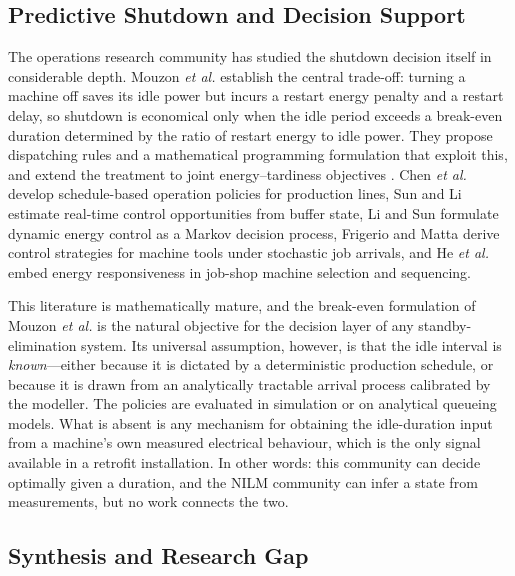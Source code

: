 \subsection{Predictive Shutdown and Decision Support}
\label{sec:rw:decision}

The operations research community has studied the shutdown decision
itself in considerable depth. Mouzon \textit{et al.}
\cite{mouzon2007operational} establish the central trade-off: turning a
machine off saves its idle power but incurs a restart energy penalty and
a restart delay, so shutdown is economical only when the idle period
exceeds a break-even duration determined by the ratio of restart energy
to idle power. They propose dispatching rules and a mathematical
programming formulation that exploit this, and extend the treatment to
joint energy--tardiness objectives \cite{mouzon2008framework}. Chen
\textit{et al.} \cite{chen2013schedule} develop schedule-based operation
policies for production lines, Sun and Li \cite{sun2013opportunity}
estimate real-time control opportunities from buffer state, Li and Sun
\cite{li2016energy} formulate dynamic energy control as a Markov
decision process, Frigerio and Matta \cite{frigerio2015energy} derive
control strategies for machine tools under stochastic job arrivals, and
He \textit{et al.} \cite{he2015energy} embed energy responsiveness in
job-shop machine selection and sequencing.

This literature is mathematically mature, and the break-even
formulation of Mouzon \textit{et al.} is the natural objective for the
decision layer of any standby-elimination system. Its universal
assumption, however, is that the idle interval is \emph{known}---either
because it is dictated by a deterministic production schedule, or
because it is drawn from an analytically tractable arrival process
calibrated by the modeller. The policies are evaluated in simulation or
on analytical queueing models. What is absent is any mechanism for
obtaining the idle-duration input from a machine's own measured
electrical behaviour, which is the only signal available in a retrofit
installation. In other words: this community can decide optimally given
a duration, and the NILM community can infer a state from
measurements, but no work connects the two.


\subsection{Synthesis and Research Gap}
\label{sec:rw:gap}

